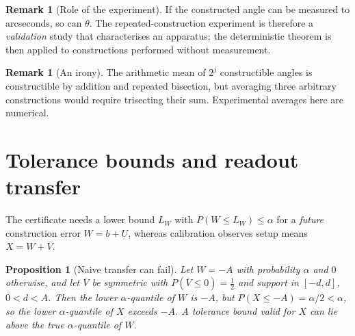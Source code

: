 \documentclass[11pt]{article}
\newtheorem{proposition}[theorem]{Proposition}
\theoremstyle{definition}
\newtheorem{remark}[theorem]{Remark}
\begin{document}
\begin{remark}[Role of the experiment]
If the constructed angle can be measured to arcseconds, so can $\theta$. The repeated-construction experiment is therefore a \emph{validation} study that characterises an apparatus; the deterministic theorem is then applied to constructions performed without measurement.
\end{remark}
\begin{remark}[An irony]
The arithmetic mean of $2^j$ constructible angles is constructible by addition and repeated bisection, but averaging three arbitrary constructions would require trisecting their sum. Experimental averages here are numerical.
\end{remark}

\begin{table}[h]\centering\small

\caption{v1: empirical coverage of nominal one-sided 95\% procedures, averaged over angles and $k$. Gaussian tolerance = 99.9\%/95\% normal tolerance bound.}\label{tab:v1}
\end{table}
\begin{table}[h]\centering\small

\caption{v1, Gaussian control, $\theta=60^\circ$, 32 observations: independent constructions beat repeated readings.}\label{tab:alloc}
\end{table}

\section{Tolerance bounds and readout transfer}\label{sec:tol}
The certificate needs a lower bound $L_W$ with $P(W\le L_W)\le\alpha$ for a \emph{future} construction error $W=b+U$, whereas calibration observes setup means $X=W+\overline V$.

\begin{proposition}[Naive transfer can fail]\label{prop:counter}
Let $W=-A$ with probability $\alpha$ and $0$ otherwise, and let $\overline V$ be symmetric with $P(\overline V\le0)=\tfrac12$ and support in $[-d,d]$, $0<d<A$. Then the lower $\alpha$-quantile of $W$ is $-A$, but $P(X\le -A)=\alpha/2<\alpha$, so the lower $\alpha$-quantile of $X$ exceeds $-A$. A tolerance bound valid for $X$ can lie above the true $\alpha$-quantile of $W$.
\end{proposition}
\end{document}
